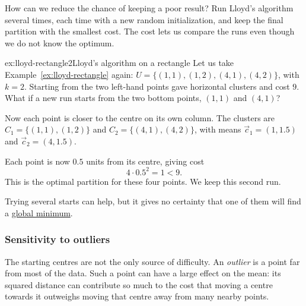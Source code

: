 \documentclass[a4paper,12pt,oneside]{report}
\begin{document}
How can we reduce the chance of keeping a poor result? Run Lloyd's
algorithm several times, each time with a new random initialization,
and keep the final partition with the smallest cost. The cost lets us
compare the runs even though we do not know the optimum.

\begin{framedexamplepart}{ex:lloyd-rectangle}{2}{Lloyd's algorithm on a rectangle}
\label{ex:lloyd-rectangle-better}
Let us take Example~\ref{ex:lloyd-rectangle} again:
$U=\{(1,1),(1,2),(4,1),(4,2)\}$, with $k=2$. Starting from the two
left-hand points gave horizontal clusters and cost $9$. What if a new
run starts from the two bottom points, $(1,1)$ and $(4,1)$?

Now each point is closer to the centre on its own column. The clusters
are $C_1=\{(1,1),(1,2)\}$ and $C_2=\{(4,1),(4,2)\}$, with means
$\vec c_1=(1,1.5)$ and $\vec c_2=(4,1.5)$.
\begin{center}
\end{center}
Each point is now $0.5$ units from its centre, giving cost
\[
  4\cdot0.5^2=1<9.
\]
This is the optimal partition for these four points. We keep this
second run.
\end{framedexamplepart}

Trying several starts can help, but it gives no certainty that one
of them will find a \hyperref[def:kmeans-global-minimum]{global minimum}.

\subsubsection{Sensitivity to outliers}
\label{sec:kmeans-outliers}

The starting centres are not the only source of difficulty. An
\emph{outlier} is a point far from most of the data. Such a point can
have a large effect on the mean: its squared distance can contribute
so much to the cost that moving a centre towards it outweighs moving
that centre away from many nearby points.
\end{document}
